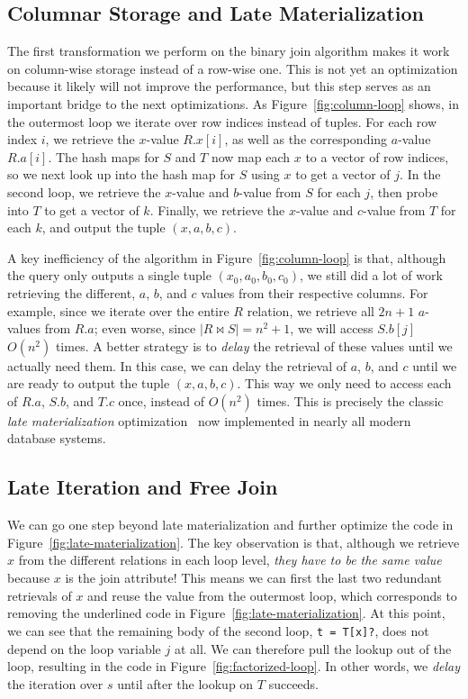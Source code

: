 \subsection{Columnar Storage and Late Materialization}\label{sec:late-materialization}
The first transformation we perform on the binary join algorithm
makes it work on column-wise storage instead of a row-wise one.
This is not yet an optimization because it likely will not improve the
performance, but this step serves as an important bridge to the next
optimizations.
As Figure~\ref{fig:column-loop} shows, in the outermost loop we
iterate over row indices instead of tuples.
For each row index $i$, we retrieve the $x$-value $R.x[i]$,
as well as the corresponding $a$-value $R.a[i]$.
The hash maps for $S$ and $T$ now map each $x$ to a vector of row indices,
so we next look up into the hash map for $S$ using $x$
to get a vector of $j$.
In the second loop, we retrieve the $x$-value and $b$-value
from $S$ for each $j$,
then probe into $T$ to get a vector of $k$.
Finally, we retrieve the $x$-value and $c$-value from $T$ for each $k$,
and output the tuple $(x, a, b, c)$.

A key inefficiency of the algorithm in Figure~\ref{fig:column-loop} is that,
although the query only outputs a single tuple $(x_0, a_0, b_0, c_0)$,
we still did a lot of work retrieving the different, $a$, $b$, and $c$ values
from their respective columns.
For example, since we iterate over the entire $R$ relation,
we retrieve all $2n+1$ $a$-values from $R.a$;
even worse, since $|R \bowtie S| = n^2 + 1$,
we will access $S.b[j]$ $O(n^2)$ times.
A better strategy is to {\em delay} the retrieval of these values
until we actually need them.
In this case, we can delay the retrieval of $a$, $b$, and $c$
until we are ready to output the tuple $(x, a, b, c)$.
This way we only need to access each of $R.a$, $S.b$, and $T.c$ once,
instead of $O(n^2)$ times.
This is precisely the classic {\em late materialization}
optimization~\cite{DBLP:conf/icde/AbadiMDM07} now implemented in
nearly all modern database systems.

\subsection{Late Iteration and Free Join}\label{sec:late-materialization}
We can go one step beyond late materialization and further optimize
the code in Figure~\ref{fig:late-materialization}.
The key observation is that, although we retrieve $x$ from the
different relations in each loop level,
{\em they have to be the same value} because $x$ is the join attribute!
This means we can first the last two redundant retrievals of $x$
and reuse the value from the outermost loop,
which corresponds to removing the underlined code
in Figure~\ref{fig:late-materialization}.
At this point, we can see that the remaining body of the second loop,
\lstinline|t = T[x]?|,
does not depend on the loop variable $j$ at all.
We can therefore pull the lookup out of the loop,
resulting in the code in Figure~\ref{fig:factorized-loop}.
In other words, we {\em delay} the iteration over $s$
until after the lookup on $T$ succeeds.

